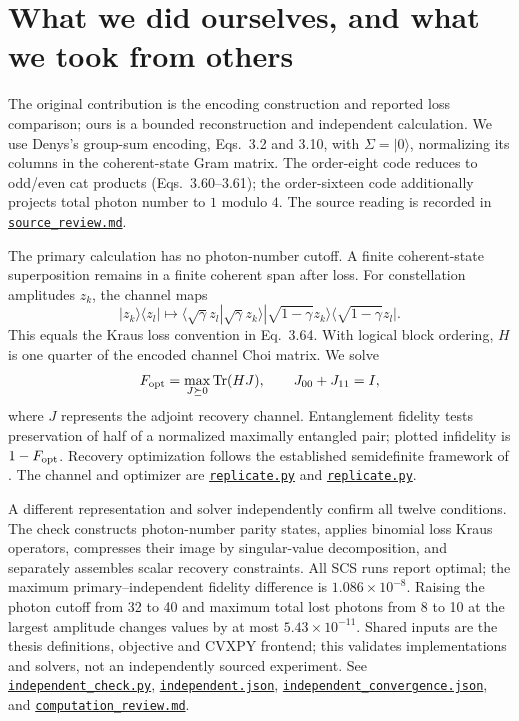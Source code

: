 \documentclass[11pt]{article}
\newcommand{\file}[2]{\href{https://github.com/alectionary/vibe-math/blob/master/formalization/denys-bosonic-pauli/#1}{\nolinkurl{#2}}}
\begin{document}
\section{What we did ourselves, and what we took from others}
The original contribution is the encoding construction and reported loss comparison; ours is a bounded reconstruction and independent calculation. We use Denys's group-sum encoding, Eqs.~3.2 and 3.10, with $\Sigma=|0\rangle$, normalizing its columns in the coherent-state Gram matrix. The order-eight code reduces to odd/even cat products (Eqs.~3.60--3.61); the order-sixteen code additionally projects total photon number to $1$ modulo $4$. The source reading is recorded in \file{provenance/source_review.md}{source_review.md}.

The primary calculation has no photon-number cutoff. A finite coherent-state superposition remains in a finite coherent span after loss. For constellation amplitudes $z_k$, the channel maps
\[
 |z_k\rangle\langle z_l|\mapsto
 \langle\sqrt\gamma z_l|\sqrt\gamma z_k\rangle
 |\sqrt{1-\gamma}z_k\rangle\langle\sqrt{1-\gamma}z_l|.
\]
This equals the Kraus loss convention in Eq.~3.64. With logical block ordering, $H$ is one quarter of the encoded channel Choi matrix. We solve
\[
 F_{\rm opt}=\max_{J\succeq0}\operatorname{Tr}(HJ),\qquad J_{00}+J_{11}=I,
\]
where $J$ represents the adjoint recovery channel. Entanglement fidelity tests preservation of half of a normalized maximally entangled pair; plotted infidelity is $1-F_{\rm opt}$. Recovery optimization follows the established semidefinite framework of \citet{fletcher}. The channel and optimizer are \file{replicate.py\#L59}{replicate.py} and \file{replicate.py\#L75}{replicate.py}.

A different representation and solver independently confirm all twelve conditions. The check constructs photon-number parity states, applies binomial loss Kraus operators, compresses their image by singular-value decomposition, and separately assembles scalar recovery constraints. All SCS runs report optimal; the maximum primary--independent fidelity difference is $1.086\times10^{-8}$. Raising the photon cutoff from 32 to 40 and maximum total lost photons from 8 to 10 at the largest amplitude changes values by at most $5.43\times10^{-11}$. Shared inputs are the thesis definitions, objective and CVXPY frontend; this validates implementations and solvers, not an independently sourced experiment. See \file{independent_check.py}{independent_check.py}, \file{outputs/independent.json}{independent.json}, \file{outputs/independent_convergence.json}{independent_convergence.json}, and \file{provenance/computation_review.md}{computation_review.md}.
\end{document}
